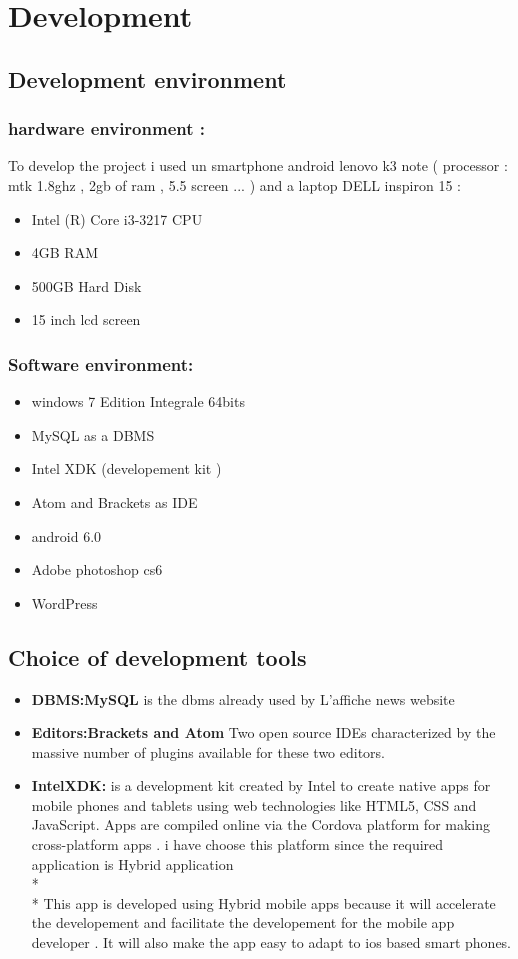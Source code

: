\chapter{Development}

\section{Development environment}
\subsection{hardware environment :}
To develop the project i used un smartphone android lenovo k3 note ( processor : mtk 1.8ghz , 2gb of ram , 5.5 screen ... ) and a laptop  DELL inspiron 15 : 
\begin{itemize}
\item Intel (R) Core i3-3217 CPU
\item 4GB RAM
\item 500GB Hard Disk
\item 15 inch lcd screen
\end{itemize}
\subsection{Software environment: }
\begin{itemize}
\item	windows 7 Edition Integrale 64bits
\item	MySQL as a DBMS 
\item	Intel XDK (developement kit ) 
\item	Atom and Brackets as IDE
\item 	android 6.0
\item 	Adobe photoshop cs6
\item 	WordPress 
\end{itemize}
\section{Choice of development tools}
\begin{itemize}
\item \textbf{DBMS:MySQL} is the dbms already used by L'affiche news website
\item \textbf{Editors:Brackets and Atom } Two open source IDEs characterized  by the massive number of plugins available for these two editors.
\item \textbf{IntelXDK:} is a development kit created by Intel to create native apps for mobile phones and tablets using web technologies like HTML5, CSS and JavaScript. Apps are compiled online via the Cordova platform for making cross-platform apps . i have choose this platform since the required application is Hybrid application 
\\*
\\*
This app is developed using Hybrid mobile apps because it will accelerate the developement and facilitate the developement for the mobile app developer . It will also make the app easy to adapt to ios based smart phones.

\end{itemize}
